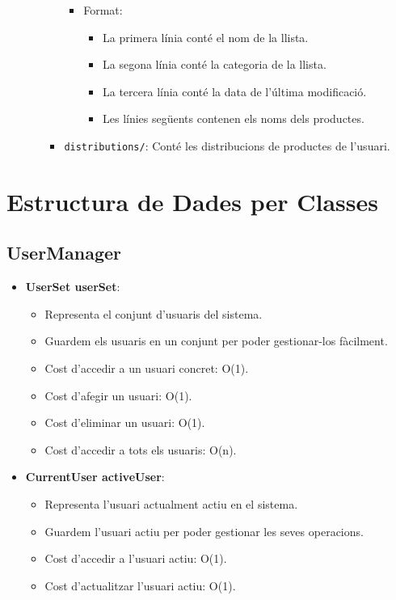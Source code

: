 \documentclass[a4paper, t]{article}
\begin{document}
\begin{itemize}
\begin{itemize}
\begin{itemize}
\begin{itemize}
                \item Format:
                \begin{itemize}
                    \item La primera línia conté el nom de la llista.
                    \item La segona línia conté la categoria de la llista.
                    \item La tercera línia conté la data de l'última modificació.
                    \item Les línies següents contenen els noms dels productes.
                \end{itemize}
            \end{itemize}
            \item \texttt{distributions/}: Conté les distribucions de productes de l'usuari.
        \end{itemize}
    \end{itemize}
\end{itemize}

\newpage
\section{Estructura de Dades per Classes}

\subsection{UserManager}
\begin{itemize}
    \item \textbf{UserSet userSet}:
    \begin{itemize}
        \item Representa el conjunt d'usuaris del sistema.
        \item Guardem els usuaris en un conjunt per poder gestionar-los fàcilment.
        \item Cost d’accedir a un usuari concret: O(1).
        \item Cost d’afegir un usuari: O(1).
        \item Cost d’eliminar un usuari: O(1).
        \item Cost d’accedir a tots els usuaris: O(n).
    \end{itemize}
    \item \textbf{CurrentUser activeUser}:
    \begin{itemize}
        \item Representa l'usuari actualment actiu en el sistema.
        \item Guardem l'usuari actiu per poder gestionar les seves operacions.
        \item Cost d’accedir a l'usuari actiu: O(1).
        \item Cost d’actualitzar l'usuari actiu: O(1).
    \end{itemize}
\end{itemize}
\end{document}
